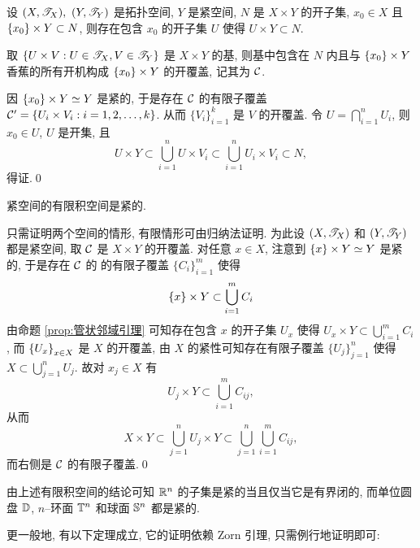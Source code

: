     \begin{Proposition}[管状邻域引理]\label{prop:管状邻域引理}
        设 $ (X,\ST_X),\ (Y,\ST_Y) $ 是拓扑空间, $ Y $ 是紧空间, $ N $ 是 $ X\times Y $ 的开子集, $ x_0\in X $ 且 $ \set{x_0}\times Y\subset N $, 则存在包含 $ x_0 $ 的开子集 $ U $ 使得 $ U\times Y\subset N $.
    \end{Proposition}
    \begin{Proof}
        取 $ \set{U\times V : U\in\ST_X, V\in\ST_Y} $ 是 $ X\times Y $ 的基, 则基中包含在 $ N $ 内且与 $ \set{x_0}\times Y $ 香蕉的所有开机构成 $ \set{x_0}\times Y $ 的开覆盖, 记其为 $ \CC $.

        因 $ \set{x_0}\times Y\simeq Y $ 是紧的, 于是存在 $ \CC $ 的有限子覆盖 $ \CC'=\set{U_i\times V_i : i=1,2,\dots,k} $. 从而 $ \{V_i\}_{i=1}^k $ 是 $ V $ 的开覆盖. 令 $ U=\bigcap_{i=1}^n U_i $, 则 $ x_0\in U $, $ U $ 是开集, 且
        \[
            U\times Y\subset\bigcup_{i=1}^nU\times V_i\subset\bigcup_{i=1}^nU_i\times V_i\subset N,
        \]
        得证.\qed
    \end{Proof}

    \begin{Theorem}
        紧空间的有限积空间是紧的.
    \end{Theorem}
    \begin{Proof}
        只需证明两个空间的情形, 有限情形可由归纳法证明. 为此设 $ (X,\ST_X) $ 和 $ (Y,\ST_Y) $ 都是紧空间, 取 $ \CC $ 是 $ X\times Y $ 的开覆盖. 对任意 $ x\in X $, 注意到 $ \set{x}\times Y\simeq Y $ 是紧的, 于是存在 $ \CC $ 的 的有限子覆盖 $ \{C_i\}_{i=1}^m $ 使得
        \[
            \set{x}\times Y\subset\bigcup_{i=1}^mC_i
        \]
        由命题 \ref{prop:管状邻域引理} 可知存在包含 $ x $ 的开子集 $ U_x $ 使得 $ U_x\times Y\subset\bigcup_{i=1}^mC_i $, 而 $ \set{U_x}_{x\in X} $ 是 $ X $ 的开覆盖, 由 $ X $ 的紧性可知存在有限子覆盖 $ \{U_j\}_{j=1}^n $ 使得 $ X\subset\bigcup_{j=1}^nU_j $. 故对 $ x_j\in X $ 有
        \[
            U_j\times Y\subset\bigcup_{i=1}^mC_{ij},
        \]
        从而
        \[
            X\times Y\subset\bigcup_{j=1}^nU_j\times Y\subset\bigcup_{j=1}^n\bigcup_{i=1}^mC_{ij},
        \]
        而右侧是 $ \CC $ 的有限子覆盖.\qed
    \end{Proof}

    由上述有限积空间的结论可知 $ \R^n $ 的子集是紧的当且仅当它是有界闭的, 而单位圆盘 $ \D $, $ n $--环面 $ \T^n $ 和球面 $ \S^n $ 都是紧的.

    更一般地, 有以下定理成立, 它的证明依赖 Zorn 引理, 只需例行地证明即可:

